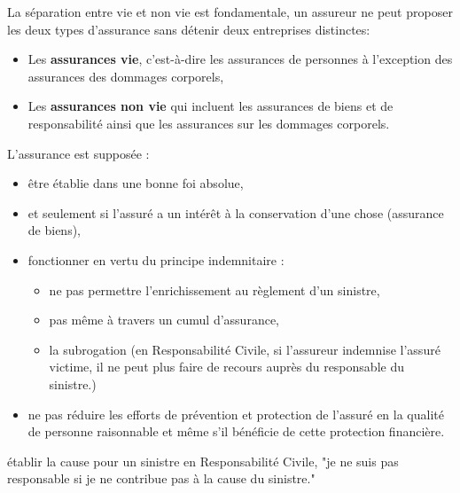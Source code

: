 \begin{f}
	
La séparation entre vie et non vie est fondamentale, un assureur ne peut proposer les deux types d'assurance sans détenir deux entreprises distinctes: 	
\begin{itemize}
	\item Les \textbf{assurances vie}, c'est-à-dire les assurances de personnes à l'exception des assurances des dommages corporels,
	\item Les \textbf{assurances non vie} qui incluent les assurances de biens et de responsabilité ainsi que les assurances sur les dommages corporels. 
\end{itemize}
\end{f}


\begin{f}
	
	
L'assurance est supposée :
	\begin{itemize}
		\item être établie dans une bonne foi absolue,
		\item et seulement si l'assuré a un intérêt à la conservation d'une chose (assurance de biens),
		\item fonctionner en vertu du principe indemnitaire : 
		\begin{itemize}
			\item ne pas permettre l'enrichissement au règlement d'un sinistre,
			\item pas même à travers un cumul d'assurance, 
			\item la subrogation (en Responsabilité Civile, si l'assureur indemnise l'assuré victime, il ne peut plus faire de recours auprès du responsable du sinistre.) 
		\end{itemize}
		\item ne pas réduire les efforts de prévention et protection de l'assuré en la qualité de personne raisonnable et même s'il bénéficie de cette protection financière.
	\end{itemize}
	\item établir la cause pour un sinistre en Responsabilité Civile, "je ne suis pas responsable si je ne contribue pas à la cause du sinistre."
\end{f}


